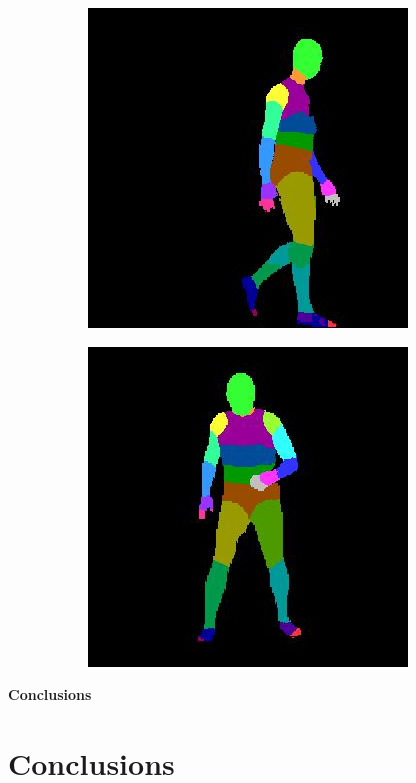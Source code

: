 \documentclass{beamer}
\begin{document}
\begin{frame}
\begin{figure}
\begin{subfigure}{.19\textwidth}
\end{subfigure}
\begin{subfigure}{.19\textwidth}
  \centering
  \includegraphics[scale=0.12]{40_02_c0011_19.jpg}
\end{subfigure}
\begin{subfigure}{.189\textwidth}
  \centering
  \includegraphics[scale=0.12]{104_52_c0002_64.jpg}
\end{subfigure}


\label{final:inference}
\end{figure}
\end{frame}

\begin{frame}
\huge{\centerline{\textbf{Conclusions}}}
\end{frame}
\section{Conclusions}
\end{document}
